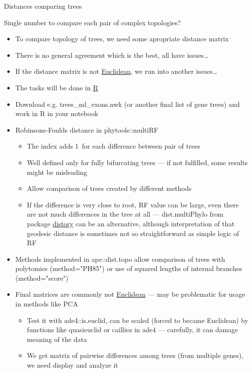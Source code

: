 \documentclass[compress, ucs, xelatex, 11pt, xcolor=x11names, aspectratio=1609,
	hyperref={
		bookmarks=true,
		unicode=true,
		colorlinks=true,
		pdftitle={HybSeq course},
		plainpages=false,
		pdfauthor={Vojtech Zeisek},
		pdfsubject={Practical processing of HybSeq target enrichment sequencing data on computing grids like MetaCentrum},
		pdfcreator={XeLaTeX},
		pdfkeywords={BASH, command line, GNU, HybSeq, Linux, MetaCentrum, sequencing shell, target enrichment},
		linkcolor=Cyan2, %
		anchorcolor=Firebrick2, %
		citecolor=Firebrick2, %
		filecolor=Firebrick2, %
		menucolor=Firebrick2, %
		urlcolor=Chartreuse2, %
		pdftex},
	url={hyphens, lowtilde} %
	]{beamer}
\renewcommand{\texttt}[1]{\colorbox{Snow4}{{\ttfamily #1}}}
\begin{document}
\begin{frame}[allowframebreaks]{Distances comparing trees}
	\begin{alertblock}{Single number to compare each pair of complex topologies?}
		\begin{itemize}
			\item To compare topology of trees, we need some apropriate distance matrix
			\item There is no general agreement which is the best, all have issues\ldots
			\item If the distance matrix is not \href{https://en.wikipedia.org/wiki/Euclidean_distance_matrix}{Euclidean}, we run into another issues\ldots
		\end{itemize}
	\end{alertblock}
	\begin{itemize}
		\item The tasks will be done in \href{https://www.r-project.org/}{R}
		\item Download e.g. \texttt{trees\_ml\_exons.nwk} (or another final list of gene trees) and work in \texttt{R} in your notebook
		\item Robinsons-Foulds distance in \texttt{phytools::multiRF}
		\begin{itemize}
			\item The index adds 1~for each difference between pair of trees
			\item Well defined only for fully bifurcating trees --- if not fulfilled, some results might be misleading
			\item Allow comparison of trees created by different methods
			\item If the difference is very close to root, RF value can be large, even there are not much differences in the tree at all --- \texttt{dist.multiPhylo} from package \href{https://CRAN.R-project.org/package=distory}{distory} can be an alternative, although interpretation of that geodesic distance is sometimes not so straightforward as simple logic of RF
		\end{itemize}
		\item Methods implemented in \texttt{ape::dist.topo} allow comparison of trees with polytomies (\texttt{method="PH85"}) or use of squared lengths of internal branches (\texttt{method="score"})
		\item Final matrices are commonly not \href{https://en.wikipedia.org/wiki/Euclidean_distance_matrix}{Euclidean} --- may be problematic for usage in methods like PCA
		\begin{itemize}
			\item Test it with \texttt{ade4::is.euclid}, can be scaled (forced to became Euclidean) by functions like \texttt{quasieuclid} or \texttt{cailliez} in \texttt{ade4} --- carefully, it can damage meaning of the data
			\item We get matrix of pairwise differences among trees (from multiple genes), we need display and analyze it
		\end{itemize}
	\end{itemize}
\end{frame}
\end{document}

